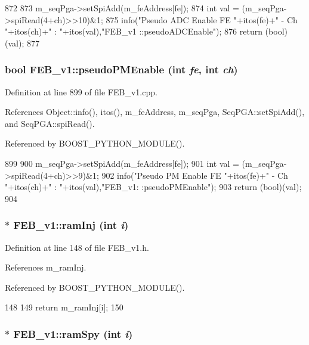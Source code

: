 \begin{DoxyCode}
872                                              {
873   m_seqPga->setSpiAdd(m_feAddress[fe]);
874   int val = (m_seqPga->spiRead(4+ch)>>10)&1;
875   info("Pseudo ADC Enable FE "+itos(fe)+" - Ch "+itos(ch)+" : "+itos(val),"FEB_v1
      ::pseudoADCEnable");
876   return (bool)(val);
877 }
\end{DoxyCode}
\hypertarget{classFEB__v1_ab6b076d6e1372bfa8d9fd2916b1b52cd}{
\subsubsection[{pseudoPMEnable}]{\setlength{\rightskip}{0pt plus 5cm}bool FEB\_\-v1::pseudoPMEnable (int {\em fe}, \/  int {\em ch})}}
\label{classFEB__v1_ab6b076d6e1372bfa8d9fd2916b1b52cd}


Definition at line 899 of file FEB\_\-v1.cpp.

References Object::info(), itos(), m\_\-feAddress, m\_\-seqPga, SeqPGA::setSpiAdd(), and SeqPGA::spiRead().

Referenced by BOOST\_\-PYTHON\_\-MODULE().


\begin{DoxyCode}
899                                             {
900   m_seqPga->setSpiAdd(m_feAddress[fe]);
901   int val = (m_seqPga->spiRead(4+ch)>>9)&1;
902   info("Pseudo PM Enable FE "+itos(fe)+" - Ch "+itos(ch)+" : "+itos(val),"FEB_v1:
      :pseudoPMEnable");
903   return (bool)(val);
904 }
\end{DoxyCode}
\hypertarget{classFEB__v1_aceff066f476794fefe2712e43bc2d6d2}{
\subsubsection[{ramInj}]{$\ast$ FEB\_\-v1::ramInj (int {\em i})}}
\label{classFEB__v1_aceff066f476794fefe2712e43bc2d6d2}


Definition at line 148 of file FEB\_\-v1.h.

References m\_\-ramInj.

Referenced by BOOST\_\-PYTHON\_\-MODULE().


\begin{DoxyCode}
148                      {
149     return m_ramInj[i];
150   }
\end{DoxyCode}
\hypertarget{classFEB__v1_ac59216f094007ede67d49bd23287be73}{
\subsubsection[{ramSpy}]{$\ast$ FEB\_\-v1::ramSpy (int {\em i})}}
\label{classFEB__v1_ac59216f094007ede67d49bd23287be73}


